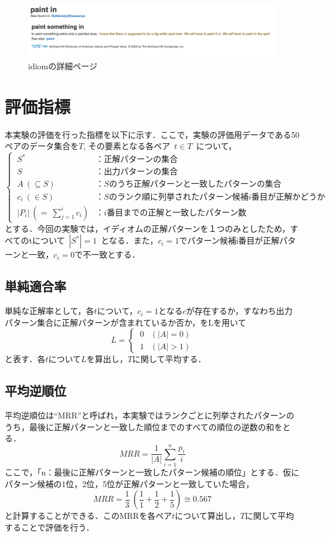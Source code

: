 \documentclass[12pt,twoside, fleqn]{ujbook}
\begin{document}
	\begin{figure}[htbp]
	\begin{center}
		\includegraphics [clip, width=16cm]{./img/idiomsyousai.png}
		\caption{idiomの詳細ページ}
		\label{site:idiomsyousai}
	\end{center}
	\end{figure}	


\section{評価指標}
	本実験の評価を行った指標を以下に示す．ここで，実験の評価用データである50ペアのデータ集合を$T$, その要素となる各ペア\ $t \in T$\ について，
	\[
	\begin{cases}
		\ S^* & ：正解パターンの集合\\
		\ S & ：出力パターンの集合\\
		\ A\ (\subseteq S) & ：Sのうち正解パターンと一致したパターンの集合\\
		\ c_{i}\ (\in S) &：Sのランク順に列挙されたパターン候補i番目が正解かどうか\\
		\ |P_{i}|\ (=\ \sum_{j=1}^{i} c_{i}) &：i番目までの正解と一致したパターン数
	\end{cases}
	\]
	とする．今回の実験では，イディオムの正解パターンを１つのみとしたため，すべてのtについて\ $|S^*|=1$\ となる．また，$c_{i}=1$でパターン候補i番目が正解パターンと一致，$c_{i}=0$で不一致とする．

	\subsection{単純適合率}
	単純な正解率として，各$t$について，$c_{i}=1$となる$c$が存在するか，すなわち出力パターン集合に正解パターンが含まれているか否か，をLを用いて
	\[
	L=\begin{cases}
		\ 0 & (|A| = 0)\\
		\ 1 & (|A| > 1)
	\end{cases}
	\]
	と表す．各$t$について$L$を算出し，$T$に関して平均する．

	\newpage
	\subsection{平均逆順位}
	\label{text:heikingyaku}
	平均逆順位は``MRR''と呼ばれ，本実験ではランクごとに列挙されたパターンのうち，最後に正解パターンと一致した順位までのすべての順位の逆数の和をとる．
	$$
	MRR=\frac{1}{|A|} \sum_{i=1}^n \frac{p_{i}}{i}
	$$
	ここで，「n：最後に正解パターンと一致したパターン候補の順位」とする．仮にパターン候補の1位，2位，5位が正解パターンと一致していた場合，
	$$
	MRR=\frac{1}{3}\ (\frac{1}{1} + \frac{1}{2} + \frac{1}{5}) \cong 0.567
	$$
	と計算することができる．このMRRを各ペア$t$について算出し，$T$に関して平均することで評価を行う．
\end{document}
